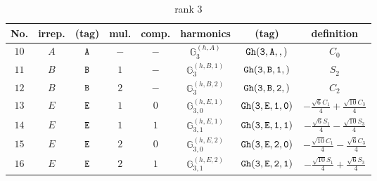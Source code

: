 \documentclass[fleqn,8pt]{jsarticle}
\begin{document}
\begin{table}[ht!]
\begin{center}
\caption{rank 3}
\renewcommand{\arraystretch}{1.3}
\begin{tabular}{cccccccc} \hline \hline
No. & irrep. & (tag) & mul. & comp. & harmonics & (tag) & definition \\ \hline
$ 10 $ & $ A $ & $ {\tt A} $ & $ - $ & $ - $ & $ \mathbb{G}_{3}^{(h,A)} $ & $ {\tt Gh(3,A,,)} $ & $ C_{0} $ \\
$ 11 $ & $ B $ & $ {\tt B} $ & $ 1 $ & $ - $ & $ \mathbb{G}_{3}^{(h,B,1)} $ & $ {\tt Gh(3,B,1,)} $ & $ S_{2} $ \\
$ 12 $ & $ B $ & $ {\tt B} $ & $ 2 $ & $ - $ & $ \mathbb{G}_{3}^{(h,B,2)} $ & $ {\tt Gh(3,B,2,)} $ & $ C_{2} $ \\
$ 13 $ & $ E $ & $ {\tt E} $ & $ 1 $ & $ 0 $ & $ \mathbb{G}_{3,0}^{(h,E,1)} $ & $ {\tt Gh(3,E,1,0)} $ & $ - \frac{\sqrt{6} C_{1}}{4} + \frac{\sqrt{10} C_{3}}{4} $ \\
$ 14 $ & $ E $ & $ {\tt E} $ & $ 1 $ & $ 1 $ & $ \mathbb{G}_{3,1}^{(h,E,1)} $ & $ {\tt Gh(3,E,1,1)} $ & $ - \frac{\sqrt{6} S_{1}}{4} - \frac{\sqrt{10} S_{3}}{4} $ \\
$ 15 $ & $ E $ & $ {\tt E} $ & $ 2 $ & $ 0 $ & $ \mathbb{G}_{3,0}^{(h,E,2)} $ & $ {\tt Gh(3,E,2,0)} $ & $ - \frac{\sqrt{10} C_{1}}{4} - \frac{\sqrt{6} C_{3}}{4} $ \\
$ 16 $ & $ E $ & $ {\tt E} $ & $ 2 $ & $ 1 $ & $ \mathbb{G}_{3,1}^{(h,E,2)} $ & $ {\tt Gh(3,E,2,1)} $ & $ - \frac{\sqrt{10} S_{1}}{4} + \frac{\sqrt{6} S_{3}}{4} $ \\
 \hline \hline
\end{tabular}
\end{center}
\end{table}
\end{document}
